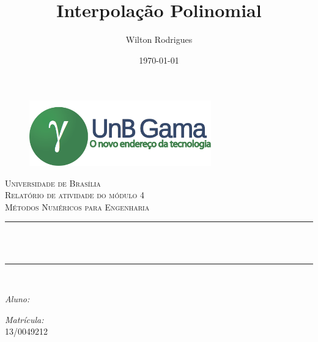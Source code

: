 \documentclass[12pt, hidelinks]{article}
\title{Interpolação Polinomial}         %
\author{Wilton Rodrigues}								%
\date{\today}											      %
\makeatletter
\let\thetitle\@title
\let\theauthor\@author
\let\thedate\@date
\makeatother
\begin{document}

\begin{titlepage}
  \centering
  \begin{figure}[H]
    \centering
    \includegraphics[width=0.7\textwidth]{figuras/logo.png}\\[2.0 cm]
  \end{figure}
  \textsc{\LARGE Universidade de Brasília}\\[2.5 cm]	%
  \textsc{\Large Relatório de atividade do módulo 4}\\[0.5 cm]				%
  \textsc{\large Métodos Numéricos para Engenharia}\\[1.5 cm]				%
  \rule{\linewidth}{0.2 mm} \\[0.4 cm]
  {\huge \bfseries \thetitle}\\
  \rule{\linewidth}{0.2 mm} \\[2.5 cm]

  \begin{minipage}{0.4\textwidth}
    \begin{flushleft} \large
      \emph{Aluno:}\\
      \theauthor
    \end{flushleft}
  \end{minipage}
  \begin{minipage}{0.4\textwidth}
    \begin{flushright} \large
      \emph{Matrícula:} \\
      13/0049212									%
    \end{flushright}
  \end{minipage}\\
  \vspace*{0.5in}
  {\large \thedate}\\[0.5 cm]

  \vfill

\end{titlepage}

\end{document}
